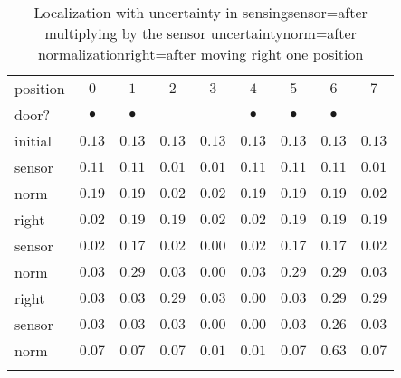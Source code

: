 \begin{table}
\caption[Localization with uncertainty in sensing]{Localization with uncertainty in sensing\newline{}sensor=after multiplying by the sensor uncertainty\newline{}norm=after normalization\newline{}right=after moving right one position}\label{tab.uncertain-sensing}
\setlength{\tabcolsep}{6pt}
\begin{tabular}{l|rrrrrrrr}
\svhline\noalign{\smallskip}
position&\multicolumn{1}{c}{$0$}&\multicolumn{1}{c}{$1$}&\multicolumn{1}{c}{$2$}&\multicolumn{1}{c}{$3$}&\multicolumn{1}{c}{$4$}&\multicolumn{1}{c}{$5$}&\multicolumn{1}{c}{$6$}&\multicolumn{1}{c}{$7$}\\
door?&\multicolumn{1}{c}{$\bullet$}&\multicolumn{1}{c}{$\bullet$}&&&\multicolumn{1}{c}{$\bullet$}&\multicolumn{1}{c}{$\bullet$}&\multicolumn{1}{c}{$\bullet$}&\\
\svhline\noalign{\smallskip}
initial &$0.13$ & $0.13$ & $0.13$ & $0.13$ & $0.13$ & $0.13$ & $0.13$ & $0.13$\\
sensor  &$0.11$ & $0.11$ & $0.01$ & $0.01$ & $0.11$ & $0.11$ & $0.11$ & $0.01$\\
norm    &$0.19$ & $0.19$ & $0.02$ & $0.02$ & $0.19$ & $0.19$ & $0.19$ & $0.02$\\
\hline
right   &$0.02$ & $0.19$ & $0.19$ & $0.02$ & $0.02$ & $0.19$ & $0.19$ & $0.19$\\
sensor  &$0.02$ & $0.17$ & $0.02$ & $0.00$ & $0.02$ & $0.17$ & $0.17$ & $0.02$\\
norm    &$0.03$ & $0.29$ & $0.03$ & $0.00$ & $0.03$ & $0.29$ & $0.29$ & $0.03$\\
\hline
right   &$0.03$ & $0.03$ & $0.29$ & $0.03$ & $0.00$ & $0.03$ & $0.29$ & $0.29$\\
sensor  &$0.03$ & $0.03$ & $0.03$ & $0.00$ & $0.00$ & $0.03$ & $0.26$ & $0.03$\\
norm    &$0.07$ & $0.07$ & $0.07$ & $0.01$ & $0.01$ & $0.07$ & $0.63$ & $0.07$\\
\noalign{\smallskip}\svhline\noalign{\smallskip}
\end{tabular}
\end{table}

